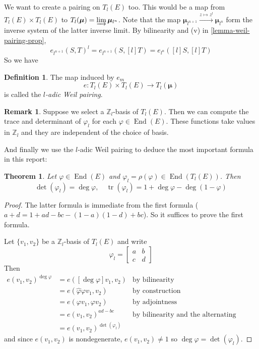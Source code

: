 \documentclass[12pt]{article}
\newtheorem{theorem}{Theorem}[subsection]
\theoremstyle{remark}
\theoremstyle{definition}
\newtheorem{remark}{Remark}[subsection]
\newtheorem{definition}{Definition}[subsection]
\newcommand{\Z}[0]{\mathbb{Z}}
\newcommand{\End}[0]{\operatorname{End}}
\begin{document}
            We want to create a pairing on $T_l(E)$ too. This would be a map from $T_l(E)\times T_l(E)$ to $T_l(\boldsymbol{\mu})=\varinjlim\boldsymbol{\mu}_{l^n}$. Note that the map $\boldsymbol{\mu}_{l^{n+1}}\xrightarrow{z\mapsto z^l}\boldsymbol{\mu}_{l^n}$ form the inverse system of the latter inverse limit. By bilinearity and (v) in \autoref{lemma-weil-pairing-prop},
            \[e_{l^{n+1}}(S, T)^l=e_{l^{n+1}}(S, [l]T)=e_{l^n}([l]S, [l]T)\]
            So we have
            \begin{definition}
                The map induced by $e_m$
                \[e:T_l(E)\times T_l(E)\to T_l(\boldsymbol{\mu})\]
                is called the \textit{$l$-adic Weil pairing}.
            \end{definition}
            \begin{remark}
                Suppose we select a $\Z_l$-basis of $T_l(E)$. Then we can compute the trace and determinant of $\varphi_l$ for each $\varphi\in\End(E)$. These functions take values in $\Z_l$ and they are independent of the choice of basis.
            \end{remark}
            And finally we use the $l$-adic Weil pairing to deduce the most important formula in this report:
            \begin{theorem}\label{theorem-map-deg-tr}
                Let $\varphi\in \End(E)$ and $\varphi_l=\rho(\varphi)\in\End(T_l(E))$. Then
                \[\det(\varphi_l)=\deg\varphi,\quad\operatorname{tr}(\varphi_l)=1+\deg\varphi-\deg(1-\varphi)\]
            \end{theorem}
            \begin{proof}
                The latter formula is immediate from the first formula ($a+d=1+ad-bc-(1-a)(1-d)+bc$). So it suffices to prove the first formula.
                
                Let $\{v_1,v_2\}$ be a $\Z_l$-basis of $T_l(E)$ and write
                \[\varphi_l=\begin{bmatrix}
                a & b\\
                c & d
                \end{bmatrix}\]
                Then
                \begin{align*}
                    e(v_1,v_2)^{\deg\varphi}&=e([\deg\varphi]v_1,v_2)&\text{by bilinearity}\\
                    &=e(\hat\varphi\varphi v_1,v_2)&\text{by construction}\\
                    &=e(\varphi v_1,\varphi v_2)&\text{by adjointness}\\
                    &=e(v_1,v_2)^{ad-bc}&\text{by bilinearity and the alternating property}\\
                    &=e(v_1,v_2)^{\det(\varphi_l)}&
                \end{align*}
                and since $e(v_1,v_2)$ is nondegenerate, $e(v_1,v_2)\neq 1$ so $\deg\varphi=\det(\varphi_l)$.
            \end{proof}
\end{document}
